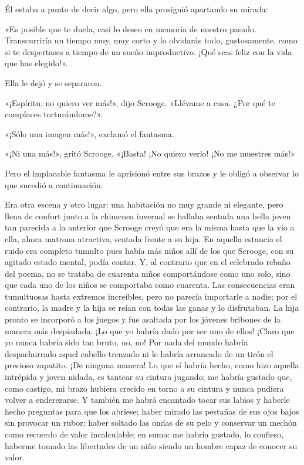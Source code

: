 \documentclass{novela}
\begin{document}
 Él estaba a punto de decir algo, pero ella prosiguió apartando su mirada:

 «Es posible que te duela, casi lo deseo en memoria de nuestro pasado. Transcurriría un tiempo muy, muy corto y lo olvidarás todo, gustosamente, como si te despertases a tiempo de un sueño improductivo. ¡Qué seas feliz con la vida que has elegido!».

 Ella le dejó y se separaron.

 «¡Espíritu, no quiero ver más!», dijo Scrooge. «Llévame a casa. ¿Por qué te complaces torturándome?».

 «¡Sólo una imagen más!», exclamó el fantasma.

 «¡Ni una más!», gritó Scrooge. «¡Basta! ¡No quiero verlo! ¡No me muestres más!»

 Pero el implacable fantasma le aprisionó entre sus brazos y le obligó a observar lo que sucedió a continuación.

 Era otra escena y otro lugar: una habitación no muy grande ni elegante, pero llena de confort junto a la chimenea invernal se hallaba sentada una bella joven tan parecida a la anterior que Scrooge creyó que era la misma hasta que la vio a ella, ahora matrona atractiva, sentada frente a su hija. En aquella estancia el ruido era completo tumulto pues había más niños allí de los que Scrooge, con su agitado estado mental, podía contar. Y, al contrario que en el celebrado rebaño del poema, no se trataba de cuarenta niños comportándose como uno solo, sino que cada uno de los niños se comportaba como cuarenta. Las consecuencias eran tumultuosas hasta extremos increíbles, pero no parecía importarle a nadie; por el contrario, la madre y la hija se reían con todas las ganas y lo disfrutaban. La hija pronto se incorporó a los juegos y fue asaltada por los jóvenes bribones de la manera más despiadada. ¡Lo que yo habría dado por ser uno de ellos! ¡Claro que yo nunca habría sido tan bruto, no, no! Por nada del mundo habría despachurrado aquel cabello trenzado ni le habría arrancado de un tirón el precioso zapatito. ¡De ninguna manera! Lo que sí habría hecho, como hizo aquella intrépida y joven nidada, es tantear su cintura jugando; me habría gustado que, como castigo, mi brazo hubiera crecido en torno a su cintura y nunca pudiera volver a enderezarse. Y también me habrá encantado tocar sus labios y haberle hecho preguntas para que los abriese; haber mirado las pestañas de sus ojos bajos sin provocar un rubor; haber soltado las ondas de su pelo y conservar un mechón como recuerdo de valor incalculable; en suma: me habría gustado, lo confieso, haberme tomado las libertades de un niño siendo un hombre capaz de conocer su valor.
\end{document}

